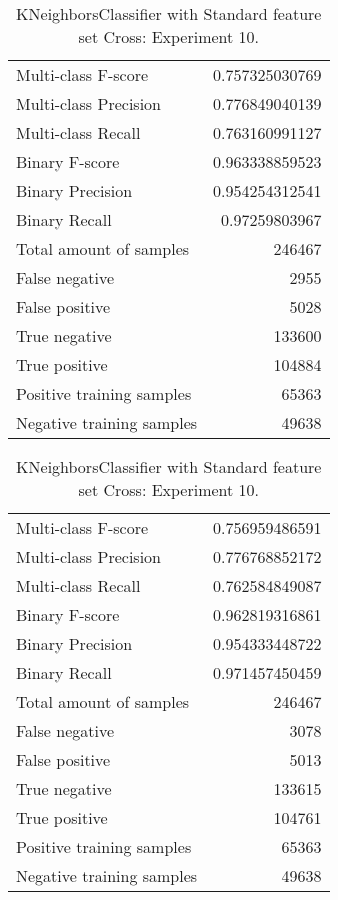 \begin{table}[H]
\begin{minipage}{0.5\textwidth}
\caption{KNeighborsClassifier with Standard feature set Cross: Experiment 9.}
\centering
\begin{tabular}{l r}
\toprule
Multi-class F-score & 0.757325030769 \\
Multi-class Precision & 0.776849040139 \\
Multi-class Recall & 0.763160991127 \\
\midrule
Binary F-score & 0.963338859523 \\
Binary Precision & 0.954254312541 \\
Binary Recall & 0.97259803967 \\
\midrule
Total amount of samples & 246467 \\
False negative & 2955 \\
False positive & 5028 \\
True negative & 133600 \\
True positive & 104884 \\
\midrule
Positive training samples & 65363 \\
Negative training samples & 49638 \\
\bottomrule
\end{tabular}
\end{minipage}
\hfillx
\begin{minipage}{0.5\textwidth}
\caption{KNeighborsClassifier with Standard feature set Cross: Experiment 10.}
\centering
\begin{tabular}{l r}
\toprule
Multi-class F-score & 0.756959486591 \\
Multi-class Precision & 0.776768852172 \\
Multi-class Recall & 0.762584849087 \\
\midrule
Binary F-score & 0.962819316861 \\
Binary Precision & 0.954333448722 \\
Binary Recall & 0.971457450459 \\
\midrule
Total amount of samples & 246467 \\
False negative & 3078 \\
False positive & 5013 \\
True negative & 133615 \\
True positive & 104761 \\
\midrule
Positive training samples & 65363 \\
Negative training samples & 49638 \\
\bottomrule
\end{tabular}
\end{minipage}
\end{table}
